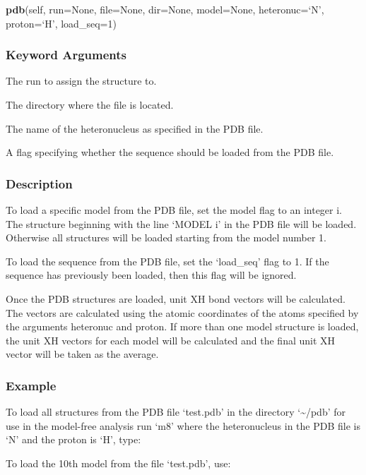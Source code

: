 \textsf{\textbf{pdb}(self, run=None, file=None, dir=None, model=None, heteronuc=`N', proton=`H', load\_seq=1)}


\subsubsection{Keyword Arguments}

  The run to assign the structure to.

  The directory where the file is located.

  The name of the heteronucleus as specified in the PDB file.

  A flag specifying whether the sequence should be loaded from the PDB file.

\subsubsection{Description}

To load a specific model from the PDB file, set the model flag to an integer i.  The
structure beginning with the line `MODEL i' in the PDB file will be loaded.  Otherwise all
structures will be loaded starting from the model number 1.

To load the sequence from the PDB file, set the `load\_seq' flag to 1.  If the sequence has
previously been loaded, then this flag will be ignored.

Once the PDB structures are loaded, unit XH bond vectors will be calculated.  The vectors
are calculated using the atomic coordinates of the atoms specified by the arguments
heteronuc and proton.  If more than one model structure is loaded, the unit XH vectors for
each model will be calculated and the final unit XH vector will be taken as the average.


\subsubsection{Example}

To load all structures from the PDB file `test.pdb' in the directory `\~{}/pdb' for use in the
model-free analysis run `m8' where the heteronucleus in the PDB file is `N' and the proton
is `H', type:



To load the 10th model from the file `test.pdb', use:




